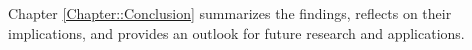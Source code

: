 \documentclass[class=scrbook, crop=false]{standalone}
\begin{document}
Chapter  \ref{Chapter::Conclusion} summarizes the findings, reflects on their implications, and provides an outlook for future research and applications.





\ifstandalone
    \printglossary
    \printbibliography[heading=bibintoc]
\fi
\end{document}
